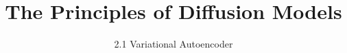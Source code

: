 ﻿%

\title{The Principles of Diffusion Models}
\subtitle{2.1 Variational Autoencoder}


\begin{frame}
    \titlepage
\end{frame}


